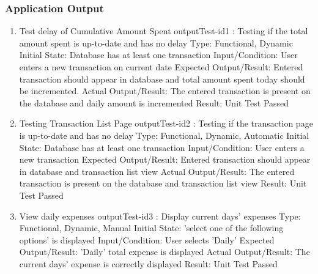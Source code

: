 \documentclass[12pt, titlepage]{article}
\begin{document}
\subsubsection{Application Output}\label{A1}
\begin{enumerate}
\item{Test delay of Cumulative Amount Spent }
\newline
outputTest-id1 : Testing if the total amount spent is up-to-date and has no delay
\newline
Type: Functional, Dynamic
\newline
Initial State: Database has at least one transaction
\newline
Input/Condition: User enters a new transaction on current date
\newline
Expected Output/Result: Entered transaction should appear in database and total amount spent today should be incremented.
\newline
Actual Output/Result: The entered transaction is present on the database and daily amount is incremented
\newline
Result: Unit Test Passed

\item{Testing Transaction List Page}\label{A2}
\newline
outputTest-id2 : Testing if the transaction page is up-to-date and has no delay
\newline
Type: Functional, Dynamic, Automatic
\newline
Initial State: Database has at least one transaction
\newline
Input/Condition: User enters a new transaction
\newline
Expected Output/Result: Entered transaction should appear in database and transaction list view
\newline
Actual Output/Result: The entered transaction is present on the database and transaction list view
\newline
Result: Unit Test Passed

\item{View daily expenses}\label{A3}
outputTest-id3 : Display current days' expenses
\newline
Type: Functional, Dynamic, Manual 
\newline
Initial State: 'select one of the following options' is displayed 
\newline
Input/Condition: User selects 'Daily'
\newline
Expected Output/Result: 'Daily' total expense is displayed
\newline
Actual Output/Result: The current days' expense is correctly displayed
\newline
Result: Unit Test Passed


\end{enumerate}
\end{document}
